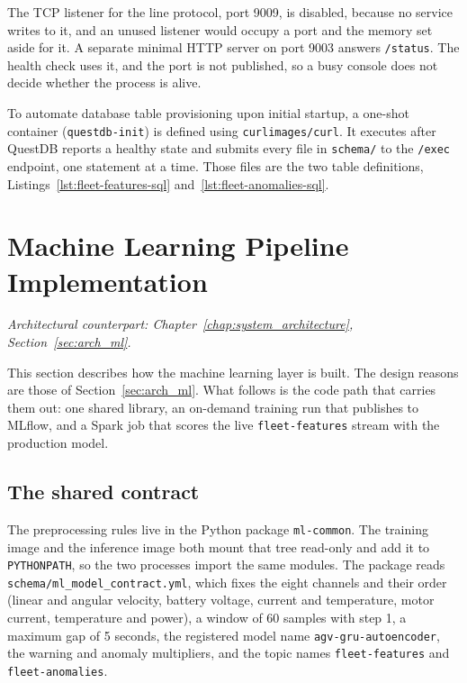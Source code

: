 The TCP listener for the line protocol, port 9009, is disabled, because no service writes to it, and an unused listener would occupy a port and the memory set aside for it. A separate minimal HTTP server on port 9003 answers \texttt{/status}. The health check uses it, and the port is not published, so a busy console does not decide whether the process is alive.

To automate database table provisioning upon initial startup, a one-shot container (\texttt{questdb-init}) is defined using \texttt{curlimages/curl}. It executes after QuestDB reports a healthy state and submits every file in \texttt{schema/} to the \texttt{/exec} endpoint, one statement at a time. Those files are the two table definitions, Listings~\ref{lst:fleet-features-sql} and~\ref{lst:fleet-anomalies-sql}.

\section{Machine Learning Pipeline Implementation}
\label{sec:ml_pipeline_implementation}
\textit{Architectural counterpart: Chapter~\ref{chap:system_architecture}, Section~\ref{sec:arch_ml}.}

This section describes how the machine learning layer is built. The design reasons are those of Section~\ref{sec:arch_ml}. What follows is the code path that carries them out: one shared library, an on-demand training run that publishes to MLflow, and a Spark job that scores the live \texttt{fleet-features} stream with the production model.

\subsection{The shared contract}
\label{subsec:ml-common-implementation}

The preprocessing rules live in the Python package \texttt{ml-common}. The training image and the inference image both mount that tree read-only and add it to \texttt{PYTHONPATH}, so the two processes import the same modules. The package reads \texttt{schema/ml\_model\_contract.yml}, which fixes the eight channels and their order (linear and angular velocity, battery voltage, current and temperature, motor current, temperature and power), a window of 60 samples with step 1, a maximum gap of 5 seconds, the registered model name \texttt{agv-gru-autoencoder}, the warning and anomaly multipliers, and the topic names \texttt{fleet-features} and \texttt{fleet-anomalies}.

